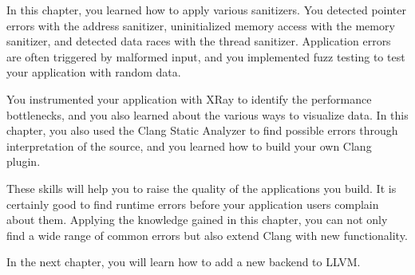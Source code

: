 In this chapter, you learned how to apply various sanitizers. You detected pointer errors with the address sanitizer, uninitialized memory access with the memory sanitizer, and detected data races with the thread sanitizer. Application errors are often triggered by malformed input, and you implemented fuzz testing to test your application with random data.\par

You instrumented your application with XRay to identify the performance bottlenecks, and you also learned about the various ways to visualize data. In this chapter, you also used the Clang Static Analyzer to find possible errors through interpretation of the source, and you learned how to build your own Clang plugin.\par

These skills will help you to raise the quality of the applications you build. It is certainly good to find runtime errors before your application users complain about them. Applying the knowledge gained in this chapter, you can not only find a wide range of common errors but also extend Clang with new functionality.\par

In the next chapter, you will learn how to add a new backend to LLVM.\par

\newpage